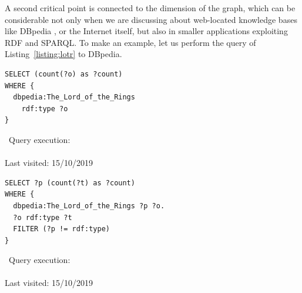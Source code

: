 A second critical point is connected to the dimension of the graph, which can be considerable not only when we are discussing about web-located knowledge bases like DBpedia \cite{lehmann2015dbpedia}, or the Internet itself, but also in smaller applications exploiting RDF and SPARQL. To make an example, let us perform the query of Listing~\ref{listing:lotr} to DBpedia.
\noindent
\begin{minipage}[c]{0.7\linewidth}
\begin{lstlisting}[caption={SPARQL query to all classes parent of the resource \texttt{dbpedia:The\_Lord\_of\_the\_Rings}},label={listing:lotr}]
SELECT (count(?o) as ?count) 
WHERE {
  dbpedia:The_Lord_of_the_Rings 
  	rdf:type ?o
}
\end{lstlisting}
\end{minipage} %
\begin{minipage}[c]{0.3\linewidth}
\noindent
\begin{center}
\faQrcode~\textsf{Query execution:}\\
\vspace*{0.2cm}
\\
\tiny{\textsf{Last visited: 15/10/2019}}
\end{center}
\end{minipage}
\noindent
\begin{minipage}[c]{0.7\linewidth}
\begin{lstlisting}[caption={SPARQL query to every link (except \texttt{rdf:type}) with \texttt{dpbedia:The\_Lord\_of\_the\_Rings} as origin, and the destination's class},label={listing:lotr2}]
SELECT ?p (count(?t) as ?count) 
WHERE {
  dbpedia:The_Lord_of_the_Rings ?p ?o.
  ?o rdf:type ?t
  FILTER (?p != rdf:type)
}
\end{lstlisting}
\end{minipage} %
\begin{minipage}[c]{0.3\linewidth}
\noindent
\begin{center}
\faQrcode~\textsf{Query execution:}\\
\vspace*{0.2cm}
\\
\tiny{\textsf{Last visited: 15/10/2019}}
\end{center}
\end{minipage}

